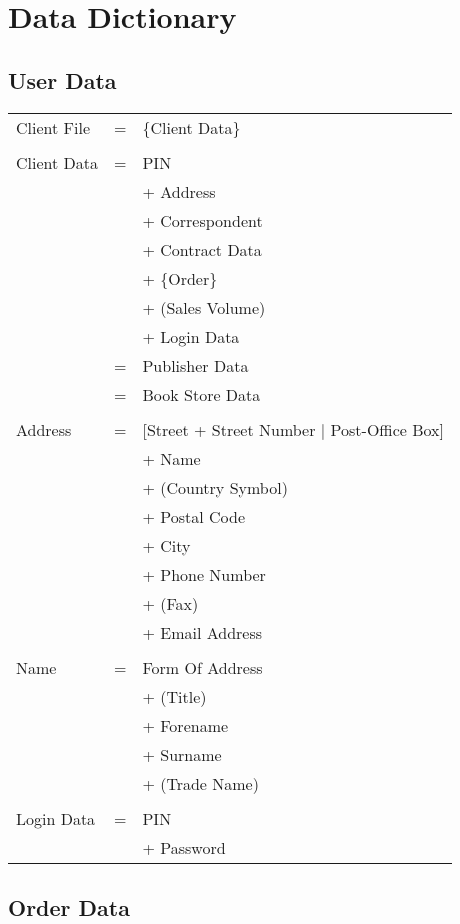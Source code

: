 \documentclass[12pt,a4paper]{article}
\begin{document}

\section{Data Dictionary}

\subsection{User Data}

\begin{tabular}{p{3.5cm}p{0.5cm}p{8.5cm}}
\\
Client File & = & \{Client Data\} \\
\\
Client Data & = & PIN\\
&  & + Address\\
&  & + Correspondent\\
&  & + Contract Data\\
&  & + \{Order\}\\
&  & + (Sales Volume)\\
&  & + Login Data \\
& = & Publisher Data\\
& = & Book Store Data\\
\\
Address & = & [Street + Street Number $|$ Post-Office Box]\\
&  & + Name\\
&  & +  (Country Symbol)\\
&  & +  Postal Code\\
&  & + City\\
&  & + Phone Number\\
&  & + (Fax)\\
&  & + Email Address\\
\\
Name & = & Form Of Address\\
&  & + (Title)\\
&  & + Forename\\
&  & + Surname\\
&  & + (Trade Name)\\
\\
Login Data & = & PIN\\
&  & + Password \\
\end{tabular}


\subsection{Order Data}
\end{document}
